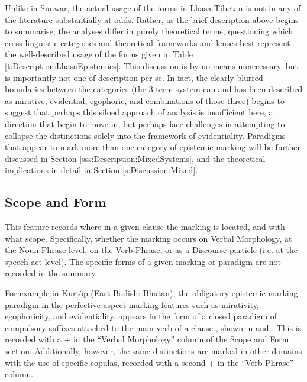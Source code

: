 Unlike in Sunwar, the actual usage of the forms in Lhasa Tibetan is not in any of the literature substantially at odds. Rather, as the brief description above begins to summarise, the analyses differ in purely theoretical terms, questioning which cross-linguistic categories and theoretical frameworks and lenses best represent the well-described usage of the forms given in Table \ref{t:Description:LhasaEpistemics}. This discussion is by no means unnecessary, but is importantly not one of description per se. In fact, the clearly blurred boundaries between the categories (the 3-term system can and has been described as mirative, evidential, egophoric, and combinations of those three) begins to suggest that perhaps this siloed approach of analysis is insufficient here, a direction that  begin to move in, but perhaps face challenges in attempting to collapse the distinctions solely into the framework of evidentiality. Paradigms that appear to mark more than one category of epistemic marking will be further discussed in Section \ref{sss:Description:MixedSystems}, and the theoretical implications in detail in Section \ref{s:Discussion:Mixed}.

\subsection{Scope and Form}\label{ss:Methods:ScopeForm}
This feature records where in a given clause the marking is located, and with what scope. Specifically, whether the marking occurs on Verbal Morphology, at the Noun Phrase level, on the Verb Phrase, or as a Discourse particle (i.e. at the speech act level). The specific forms of a given marking or paradigm are not recorded in the summary.

For example in Kurtöp (East Bodish: Bhutan), the obligatory epistemic marking paradigm in the perfective aspect marking features such as mirativity, egophoricity, and evidentiality, appears in the form of a closed paradigm of compulsory suffixes attached to the main verb of a clause \cite{Hyslop2018}, shown in  and . This is recorded with a + in the ``Verbal Morphology'' column of the Scope and Form section. Additionally, however, the same distinctions are marked in other domains with the use of specific copulas, recorded with a second + in the ``Verb Phrase'' column.


